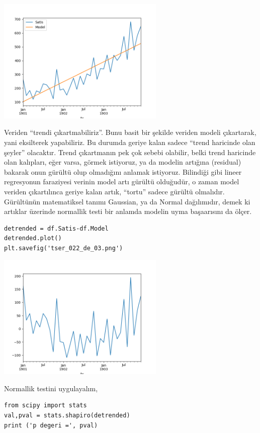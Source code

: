 \documentclass[12pt,fleqn]{article}\usepackage{../../common}
\begin{document}
\includegraphics[height=6cm]{tser_022_de_01.png}

Veriden ``trendi çıkartmabiliriz''. Bunu basit bir şekilde veriden modeli
çıkartarak, yani eksilterek yapabiliriz. Bu durumda geriye kalan sadece ``trend
haricinde olan şeyler'' olacaktır. Trend çıkartmanın pek çok sebebi olabilir,
belki trend haricinde olan kalıpları, eğer varsa, görmek istiyoruz, ya da
modelin artığına (residual) bakarak onun gürültü olup olmadığını anlamak
istiyoruz. Bilindiği gibi lineer regresyonun faraziyesi verinin model artı
gürültü olduğudür, o zaman model veriden çıkartılınca geriye kalan artık,
``tortu'' sadece gürültü olmalıdır. Gürültünün matematiksel tanımı Gaussian, ya
da Normal dağılımıdır, demek ki artıklar üzerinde normallik testi bir anlamda
modelin uyma başaarısını da ölçer. 

\begin{verbatim}
detrended = df.Satis-df.Model
detrended.plot()
plt.savefig('tser_022_de_03.png')
\end{verbatim}

\includegraphics[height=6cm]{tser_022_de_03.png}

Normallik testini uygulayalım,

\begin{verbatim}
from scipy import stats
val,pval = stats.shapiro(detrended)
print ('p degeri =', pval)
\end{verbatim}
\end{document}
